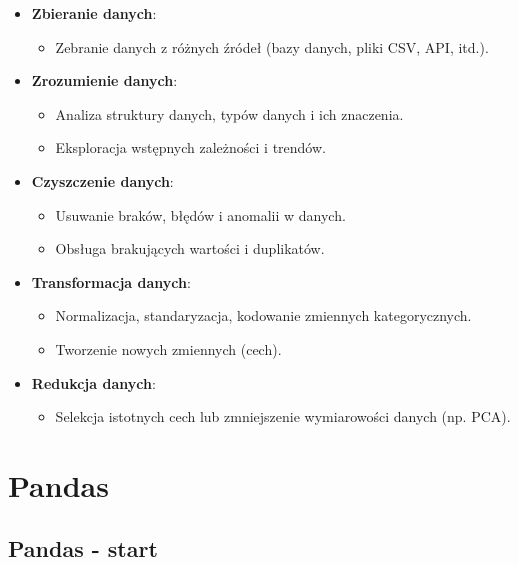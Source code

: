 \documentclass[
  polish,
  letterpaper,
  DIV=11,
  numbers=noendperiod]{scrreprt}
\providecommand{\tightlist}{%
  \setlength{\itemsep}{0pt}\setlength{\parskip}{0pt}}
\begin{document}
\begin{itemize}
\tightlist
\item
  \textbf{Zbieranie danych}:

  \begin{itemize}
  \tightlist
  \item
    Zebranie danych z różnych źródeł (bazy danych, pliki CSV, API,
    itd.).
  \end{itemize}
\item
  \textbf{Zrozumienie danych}:

  \begin{itemize}
  \tightlist
  \item
    Analiza struktury danych, typów danych i ich znaczenia.
  \item
    Eksploracja wstępnych zależności i trendów.
  \end{itemize}
\item
  \textbf{Czyszczenie danych}:

  \begin{itemize}
  \tightlist
  \item
    Usuwanie braków, błędów i anomalii w danych.
  \item
    Obsługa brakujących wartości i duplikatów.
  \end{itemize}
\item
  \textbf{Transformacja danych}:

  \begin{itemize}
  \tightlist
  \item
    Normalizacja, standaryzacja, kodowanie zmiennych kategorycznych.
  \item
    Tworzenie nowych zmiennych (cech).
  \end{itemize}
\item
  \textbf{Redukcja danych}:

  \begin{itemize}
  \tightlist
  \item
    Selekcja istotnych cech lub zmniejszenie wymiarowości danych (np.
    PCA).
  \end{itemize}
\end{itemize}

\part{Pandas}

\chapter{Pandas - start}\label{pandas---start}
\end{document}
